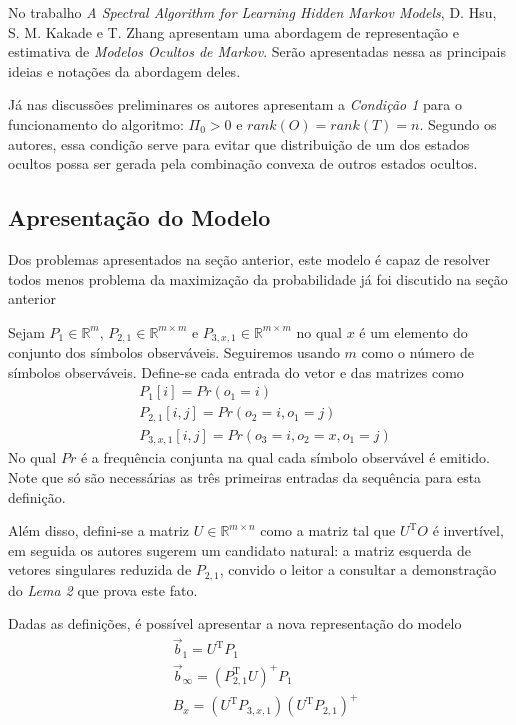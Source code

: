 \documentclass{subfiles}
\begin{document}
No trabalho \textit{A Spectral Algorithm for Learning Hidden Markov Models}, D. Hsu, S. M. Kakade e T. Zhang apresentam uma abordagem de representação e estimativa de \textit{Modelos Ocultos de Markov}. Serão apresentadas nessa as principais ideias e notações da abordagem deles.

Já nas discussões preliminares os autores apresentam a \textit{Condição 1} para o funcionamento do algoritmo: $\Pi_0 > 0$ e $rank(O) = rank(T) = n$. Segundo os autores, essa condição serve para evitar que distribuição de um dos estados ocultos possa ser gerada pela combinação convexa de outros estados ocultos.

\subsection{Apresentação do Modelo}

Dos problemas apresentados na seção anterior, este modelo é capaz de resolver todos menos problema da maximização da probabilidade já foi discutido na seção anterior

Sejam $P_1 \in \mathbb{R}^m$, $P_{2,1} \in \mathbb{R}^{m \times m}$ e $P_{3,x,1} \in \mathbb{R}^{m \times m}$ no qual $x$ é um elemento do conjunto dos símbolos observáveis. Seguiremos usando $m$ como o número de símbolos observáveis. Define-se cada entrada do vetor e das matrizes como
\begin{align*}
    & P_1[i] = Pr(o_1 = i) \\
    & P_{2,1}[i,j] = Pr(o_2=i, o_1=j) \\
    & P_{3,x,1}[i,j] = Pr(o_3=i, o_2=x, o_1=j)
\end{align*}
No qual $Pr$ é a frequência conjunta na qual cada símbolo observável é emitido. Note que só são necessárias as três primeiras entradas da sequência para esta definição.

Além disso, defini-se a matriz $U \in \mathbb{R}^{m \times n}$ como a matriz tal que $U^{\mathrm T} O$ é invertível, em seguida os autores sugerem um candidato natural: a matriz esquerda de vetores singulares reduzida de $P_{2,1}$, convido o leitor a consultar a demonstração do \textit{Lema 2} que prova este fato.

Dadas as definições, é possível apresentar a nova representação do modelo
\begin{align*}
    & \vec{b}_1 = U^{\mathrm T} P_1 \\
    & \vec{b}_{\infty} = (P_{2,1}^{\mathrm T} U)^+ P_1 \\
    & B_x = (U^{\mathrm T} P_{3,x,1})(U^{\mathrm T} P_{2,1})^+
\end{align*}
\end{document}
